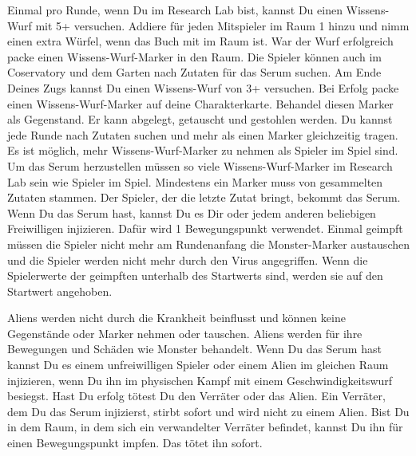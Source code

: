   \begin{itemize}
    \bitem Einmal pro Runde, wenn Du im Research Lab bist, kannst Du einen Wissens-Wurf mit 5+ versuchen. Addiere für jeden Mitspieler im Raum 1 hinzu und nimm einen extra Würfel, wenn das Buch mit im Raum ist. War der Wurf erfolgreich packe einen Wissens-Wurf-Marker in den Raum.
    \bitem Die Spieler können auch im Coservatory und dem Garten nach Zutaten für das Serum suchen.
Am Ende Deines Zugs kannst Du einen Wissens-Wurf von 3+ versuchen. Bei Erfolg packe einen Wissens-Wurf-Marker auf deine Charakterkarte. Behandel diesen Marker als Gegenstand. Er kann abgelegt, getauscht und gestohlen werden. Du kannst jede Runde nach Zutaten suchen und mehr als einen Marker gleichzeitig tragen.
    \bitem Es ist möglich, mehr Wissens-Wurf-Marker zu nehmen als Spieler im Spiel sind.
    \bitem Um das Serum herzustellen müssen so viele Wissens-Wurf-Marker im Research Lab sein wie Spieler im Spiel. Mindestens ein Marker muss von gesammelten Zutaten stammen. Der Spieler, der die letzte Zutat bringt, bekommt das Serum.
    \bitem Wenn Du das Serum hast, kannst Du es Dir oder jedem anderen beliebigen Freiwilligen injizieren. Dafür wird 1 Bewegungspunkt verwendet. Einmal geimpft müssen die Spieler nicht mehr am Rundenanfang die Monster-Marker austauschen und die Spieler werden nicht mehr durch den Virus angegriffen.
    \bitem Wenn die Spielerwerte der geimpften unterhalb des Startwerts sind, werden sie auf den Startwert angehoben.
    \end{itemize}


\newpage
{}

    \begin{itemize}
        \bitem Aliens werden nicht durch die Krankheit beinflusst und können keine Gegenstände oder Marker nehmen oder tauschen.
        \bitem Aliens werden für ihre Bewegungen und Schäden wie Monster behandelt.
        \bitem Wenn Du das Serum hast kannst Du es einem unfreiwilligen Spieler oder einem Alien im gleichen Raum injizieren, wenn Du ihn im physischen Kampf mit einem Geschwindigkeitswurf besiegst.
Hast Du erfolg tötest Du den Verräter oder das Alien.
        \bitem Ein Verräter, dem Du das Serum injizierst, stirbt sofort und wird nicht zu einem Alien.
        \bitem Bist Du in dem Raum, in dem sich ein verwandelter Verräter befindet, kannst Du ihn für einen Bewegungspunkt impfen. Das tötet ihn sofort.
    \end{itemize}


